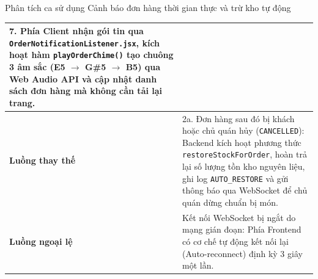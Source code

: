 \documentclass{uetgraduation}
\begin{document}
\begin{table}[!htbp]{Phân tích ca sử dụng Cảnh báo đơn hàng thời gian thực và trừ kho tự động}
\begin{tabularx}{\textwidth}{|l|>{\raggedright\arraybackslash}X|}
7. Phía Client nhận gói tin qua \texttt{OrderNotificationListener.jsx}, kích hoạt hàm \texttt{playOrderChime()} tạo chuông 3 âm sắc (E5 $\to$ G\#5 $\to$ B5) qua Web Audio API và cập nhật danh sách đơn hàng mà không cần tải lại trang. \\ \hline
\textbf{Luồng thay thế} & 
2a. Đơn hàng sau đó bị khách hoặc chủ quán hủy (\texttt{CANCELLED}): Backend kích hoạt phương thức \texttt{restoreStockForOrder}, hoàn trả lại số lượng tồn kho nguyên liệu, ghi log \texttt{AUTO\_RESTORE} và gửi thông báo qua WebSocket để chủ quán dừng chuẩn bị món. \\ \hline
\textbf{Luồng ngoại lệ} & 
Kết nối WebSocket bị ngắt do mạng gián đoạn: Phía Frontend có cơ chế tự động kết nối lại (Auto-reconnect) định kỳ 3 giây một lần. \\ \hline
\end{tabularx}
\end{table}

\clearpage
\end{document}
